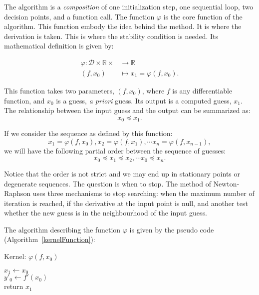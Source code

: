 \documentclass[12pt]{article}
\begin{document}
  	The algorithm is a \textit{composition} of one initialization step, one sequential loop, two decision points, and a function call.
  	The function \(\varphi\) is the core function of the algorithm.  This function embody the idea behind the method. 
  	It is where the derivation is taken. This is where the stability condition is needed.  Its mathematical definition is given by:
  
  \begin{align} \label{eq:functionalphi}
   \varphi \colon  \mathcal{D} \times \mathbb{R} \times  &\to \mathbb{R} \nonumber\\
   (f,x_0) &\mapsto x_1 = \varphi(f,x_0).
  \end{align}
  
  This function takes two parameters, \( (f, x_0)\), where \(f\) is any differentiable function, and \(x_0\) is a guess, \textit {a priori} guess. Its output is a computed guess, \(x_1\).
  The relationship between the input guess and the output can be summarized as:
  \[
  x_0 \preceq x_1.
  \]
  
  If we consider the sequence as defined by this function:
  \[
  x_1 = \varphi (f,x_0), x_2 = \varphi (f,x_1), \cdots x_n = \varphi (f,x_{n-1}),
  \]
  we will have the following partial order between the sequence of guesses:
  \[
  x_0 \preceq x_1\preceq x_2, \cdots x_0 \preceq x_n.
  \]
  
  Notice that the order is not strict and we may end up in stationary points or degenerate sequences.  The question is when to stop.
  The method of Newton-Raphson uses three mechanisms to stop searching: when the maximum number of iteration is reached,
  if the derivative at the input point is null, and another test whether the new guess is in the neighbourhood  of the input guess.
  
  The algorithm describing the function \( \varphi\) is given by the pseudo code (Algorithm~\ref {kernelFunction}):
  
  \begin{algorithm}[H]
   \caption{Kernel: $\varphi (f,x_0)$}
   \label{kernelFunction}
   	$x_1 \gets x_0 $ \\
  	$y'_0 \gets f'(x_0)$ \\  
  	return $x_1$
  \end{algorithm}
  
\end{document}
